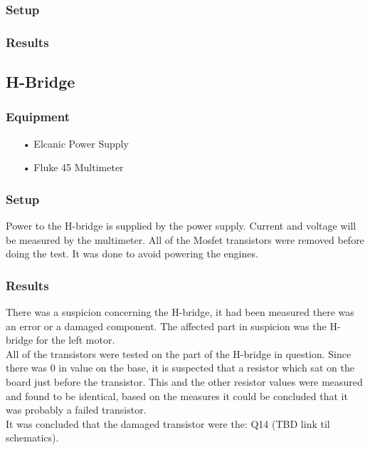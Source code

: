 \subsubsection{Setup}

\subsubsection{Results}

\subsection{H-Bridge}

\subsubsection{Equipment}
\begin{enumerate}
	\item[•]Elcanic Power Supply
	\item[•]Fluke 45 Multimeter
\end{enumerate}

\subsubsection{Setup}
Power to the H-bridge is supplied by the power supply. Current and voltage will be measured by the multimeter.
All of the Mosfet transistors were removed before doing the test. It was done to avoid powering the engines.


\subsubsection{Results}
There was a suspicion concerning the H-bridge, it had been measured there was an error or a damaged component. The affected part in suspicion was the H-bridge for the left motor.\\

All of the transistors were tested on the part of the H-bridge in question.
Since there was 0 in value on the base, it is suspected that a resistor which sat on the board just before the transistor. This and the other resistor values were measured and found to be identical, based on the measures it could be concluded that it was probably a failed transistor.\\

It was concluded that the damaged transistor were the: Q14 (TBD link til schematics).\\


